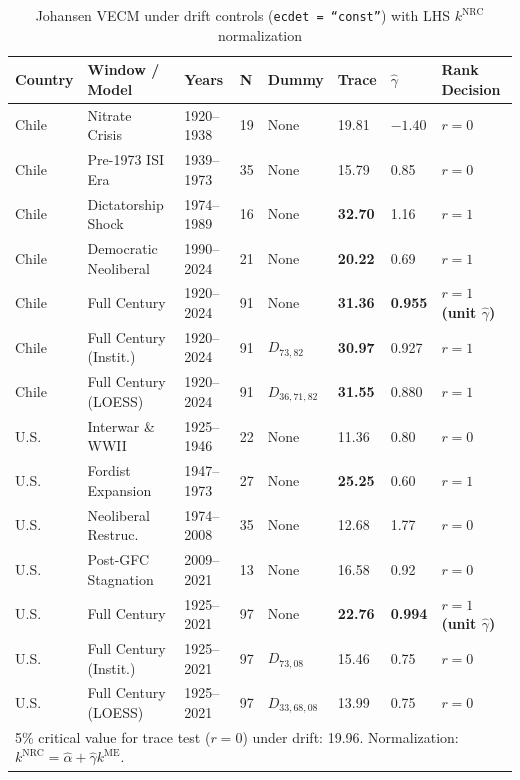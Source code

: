 \documentclass[11pt,a4paper]{article}
\begin{document}
\begin{table}[h!]
\centering
\small
\caption{Johansen VECM under drift controls (\texttt{ecdet = ``const''}) with LHS $k^{\text{NRC}}$ normalization}
\label{tab:vecm_drift_ledger}
\begin{tabular}{p{1.4cm} p{3.4cm} p{1.6cm} p{0.6cm} p{1.6cm} p{1.2cm} p{1.2cm} p{2.8cm}}
\toprule
\textbf{Country} & \textbf{Window / Model} & \textbf{Years} & \textbf{N} & \textbf{Dummy} & \textbf{Trace} & \textbf{$\hat{\gamma}$} & \textbf{Rank Decision} \\
\midrule
Chile & Nitrate Crisis & 1920--1938 & 19 & None & 19.81 & $-1.40$ & $r=0$ \\
Chile & Pre-1973 ISI Era & 1939--1973 & 35 & None & 15.79 & 0.85 & $r=0$ \\
Chile & Dictatorship Shock & 1974--1989 & 16 & None & \textbf{32.70} & 1.16 & \textbf{$r=1$} \\
Chile & Democratic Neoliberal & 1990--2024 & 21 & None & \textbf{20.22} & 0.69 & \textbf{$r=1$} \\
Chile & Full Century & 1920--2024 & 91 & None & \textbf{31.36} & \textbf{0.955} & \textbf{$r=1$ (unit $\hat{\gamma}$)} \\
Chile & Full Century (Instit.) & 1920--2024 & 91 & $D_{73,82}$ & \textbf{30.97} & 0.927 & \textbf{$r=1$} \\
Chile & Full Century (LOESS) & 1920--2024 & 91 & $D_{36,71,82}$ & \textbf{31.55} & 0.880 & \textbf{$r=1$} \\
\midrule
U.S. & Interwar \& WWII & 1925--1946 & 22 & None & 11.36 & 0.80 & $r=0$ \\
U.S. & Fordist Expansion & 1947--1973 & 27 & None & \textbf{25.25} & 0.60 & \textbf{$r=1$} \\
U.S. & Neoliberal Restruc. & 1974--2008 & 35 & None & 12.68 & 1.77 & $r=0$ \\
U.S. & Post-GFC Stagnation & 2009--2021 & 13 & None & 16.58 & 0.92 & $r=0$ \\
U.S. & Full Century & 1925--2021 & 97 & None & \textbf{22.76} & \textbf{0.994} & \textbf{$r=1$ (unit $\hat{\gamma}$)} \\
U.S. & Full Century (Instit.) & 1925--2021 & 97 & $D_{73,08}$ & 15.46 & 0.75 & $r=0$ \\
U.S. & Full Century (LOESS) & 1925--2021 & 97 & $D_{33,68,08}$ & 13.99 & 0.75 & $r=0$ \\
\bottomrule
\multicolumn{8}{p{14.2cm}}{\footnotesize 5\% critical value for trace test ($r=0$) under drift: 19.96. Normalization: $k^{\text{NRC}} = \hat{\alpha} + \hat{\gamma} k^{\text{ME}}$.}
\end{tabular}
\end{table}
\end{document}
